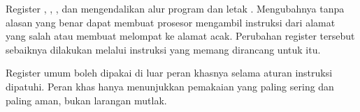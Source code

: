 \begin{peringatanbox}
\vspace{1.1em}
Register , , , dan  mengendalikan
alur program dan letak . Mengubahnya tanpa alasan yang
benar dapat membuat prosesor mengambil instruksi dari alamat yang
salah atau membuat  melompat ke alamat acak. Perubahan
register tersebut sebaiknya dilakukan melalui instruksi yang memang
dirancang untuk itu.
\end{peringatanbox}

\begin{infobox}
\vspace{1.1em}
Register umum boleh dipakai di luar peran khasnya selama aturan
instruksi dipatuhi. Peran khas hanya menunjukkan pemakaian yang
paling sering dan paling aman, bukan larangan mutlak.
\end{infobox}
